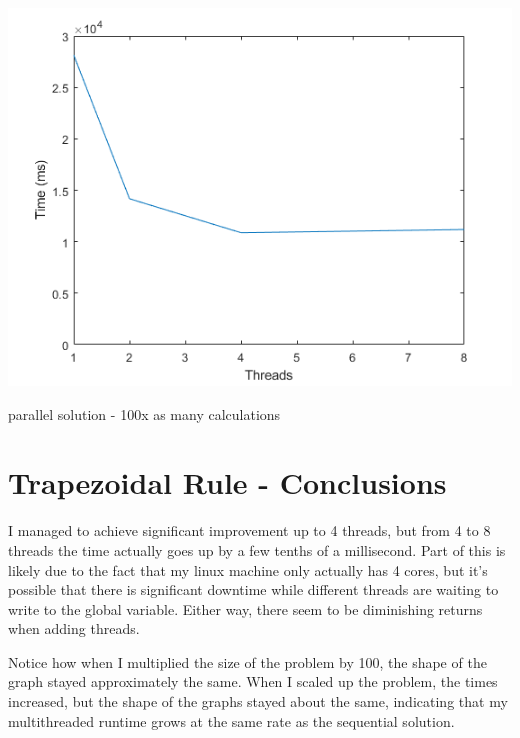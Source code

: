 \documentclass[a4paper]{article}
\begin{document}
\begin{center}
    \includegraphics[scale=1]{11c.png}
    \caption{parallel solution - 100x as many calculations}
\end{center}

\noindent


\section{Trapezoidal Rule - Conclusions}

I managed to achieve significant improvement up to 4 threads, but from 4 to 8 threads the time actually goes up by a few tenths of a millisecond. Part of this is likely due to the fact that my linux machine only actually has 4 cores, but it's possible that there is significant downtime while different threads are waiting to write to the global variable. Either way, there seem to be diminishing returns when adding threads.

Notice how when I multiplied the size of the problem by 100, the shape of the graph stayed approximately the same. When I scaled up the problem, the times increased, but the shape of the graphs stayed about the same, indicating that my multithreaded runtime grows at the same rate as the sequential solution.
\end{document}
